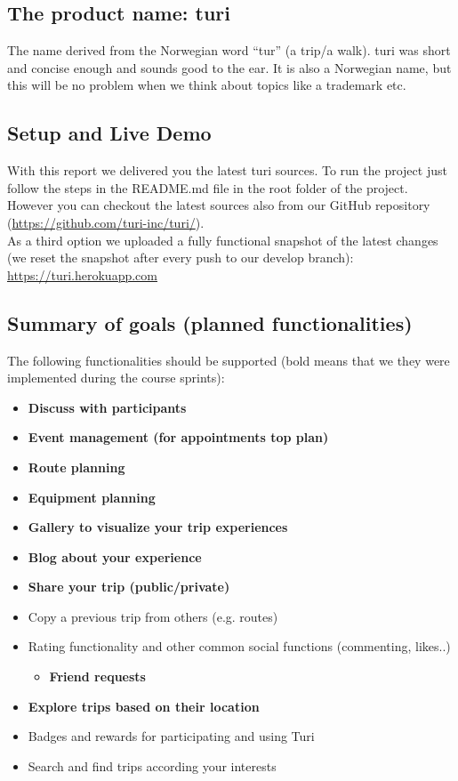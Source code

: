 \documentclass[a4paper]{article}
\begin{document}
\subsection{The product name: turi}
The name derived from the Norwegian word “tur” (a trip/a walk). turi was short and concise enough and sounds good to the ear. It is also a Norwegian name, but this will be no problem when we think about topics like a trademark etc.

\subsection{Setup and Live Demo}

With this report we delivered you the latest turi sources. To run the project just follow the steps in the README.md file in the root folder of the project. However you can checkout the latest sources also from our GitHub repository (\url{https://github.com/turi-inc/turi/}).\\

As a third option we uploaded a fully functional snapshot of the latest changes (we reset the snapshot after every push to our develop branch): \url{https://turi.herokuapp.com}

\subsection{Summary of goals (planned functionalities)}
The following functionalities should be supported (bold means that we they were implemented during the course sprints):
\begin{itemize}
  \item {\textbf{Discuss with participants}}
  \item {\textbf{Event management (for appointments top plan)}}
  \item {\textbf{Route planning}}
  \item {\textbf{Equipment planning}}
  \item {\textbf{Gallery to visualize your trip experiences}}
  \item {\textbf{Blog about your experience}}
  \item {\textbf{Share your trip (public/private)}}
  \item {Copy a previous trip from others (e.g. routes)}
  \item {Rating functionality and other common social functions (commenting, likes..)
  \begin{itemize}
    \item {\textbf{Friend requests}}
  \end{itemize}}
  \item {\textbf{Explore trips based on their location}}
  \item {Badges and rewards for participating and using Turi}
  \item {Search and find trips according your interests}
\end{itemize}
\end{document}
